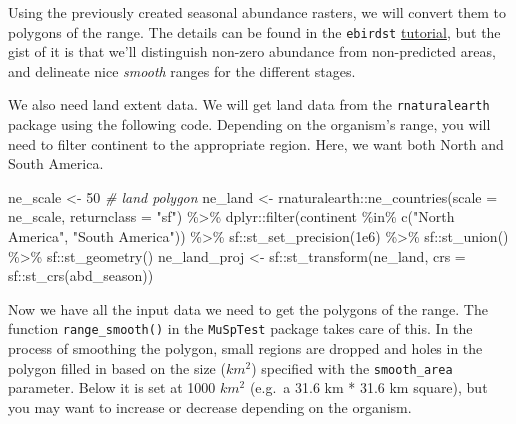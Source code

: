 \documentclass[
]{book}
\newenvironment{Shaded}{\begin{snugshade}}{\end{snugshade}}
\newcommand{\AttributeTok}[1]{\textcolor[rgb]{0.77,0.63,0.00}{#1}}
\newcommand{\CommentTok}[1]{\textcolor[rgb]{0.56,0.35,0.01}{\textit{#1}}}
\newcommand{\DecValTok}[1]{\textcolor[rgb]{0.00,0.00,0.81}{#1}}
\newcommand{\FloatTok}[1]{\textcolor[rgb]{0.00,0.00,0.81}{#1}}
\newcommand{\FunctionTok}[1]{\textcolor[rgb]{0.00,0.00,0.00}{#1}}
\newcommand{\NormalTok}[1]{#1}
\newcommand{\OtherTok}[1]{\textcolor[rgb]{0.56,0.35,0.01}{#1}}
\newcommand{\SpecialCharTok}[1]{\textcolor[rgb]{0.00,0.00,0.00}{#1}}
\newcommand{\StringTok}[1]{\textcolor[rgb]{0.31,0.60,0.02}{#1}}
\begin{document}
Using the previously created seasonal abundance rasters, we will convert them to polygons of the range. The details can be found in the \texttt{ebirdst} \href{https://cornelllabofornithology.github.io/ebirdst/articles/ebirdst-advanced-mapping.html}{tutorial}, but the gist of it is that we'll distinguish non-zero abundance from non-predicted areas, and delineate nice \emph{smooth} ranges for the different stages.

We also need land extent data. We will get land data from the \texttt{rnaturalearth} package using the following code. Depending on the organism's range, you will need to filter continent to the appropriate region. Here, we want both North and South America.

\begin{Shaded}
\begin{Highlighting}[]
\NormalTok{ne\_scale }\OtherTok{\textless{}{-}} \DecValTok{50}
\CommentTok{\# land polygon}
\NormalTok{ne\_land }\OtherTok{\textless{}{-}}\NormalTok{ rnaturalearth}\SpecialCharTok{::}\FunctionTok{ne\_countries}\NormalTok{(}\AttributeTok{scale =}\NormalTok{ ne\_scale, }\AttributeTok{returnclass =} \StringTok{"sf"}\NormalTok{) }\SpecialCharTok{\%\textgreater{}\%}
\NormalTok{  dplyr}\SpecialCharTok{::}\FunctionTok{filter}\NormalTok{(continent }\SpecialCharTok{\%in\%} \FunctionTok{c}\NormalTok{(}\StringTok{"North America"}\NormalTok{, }\StringTok{"South America"}\NormalTok{)) }\SpecialCharTok{\%\textgreater{}\%}
\NormalTok{  sf}\SpecialCharTok{::}\FunctionTok{st\_set\_precision}\NormalTok{(}\FloatTok{1e6}\NormalTok{) }\SpecialCharTok{\%\textgreater{}\%}
\NormalTok{  sf}\SpecialCharTok{::}\FunctionTok{st\_union}\NormalTok{() }\SpecialCharTok{\%\textgreater{}\%} 
\NormalTok{  sf}\SpecialCharTok{::}\FunctionTok{st\_geometry}\NormalTok{()}
\NormalTok{ne\_land\_proj }\OtherTok{\textless{}{-}}\NormalTok{ sf}\SpecialCharTok{::}\FunctionTok{st\_transform}\NormalTok{(ne\_land, }\AttributeTok{crs =}\NormalTok{ sf}\SpecialCharTok{::}\FunctionTok{st\_crs}\NormalTok{(abd\_season))}
\end{Highlighting}
\end{Shaded}

Now we have all the input data we need to get the polygons of the range. The function \texttt{range\_smooth()} in the \texttt{MuSpTest} package takes care of this. In the process of smoothing the polygon, small regions are dropped and holes in the polygon filled in based on the size (\(km^2\)) specified with the \texttt{smooth\_area} parameter. Below it is set at 1000 \(km^2\) (e.g.~a 31.6 km * 31.6 km square), but you may want to increase or decrease depending on the organism.
\end{document}
